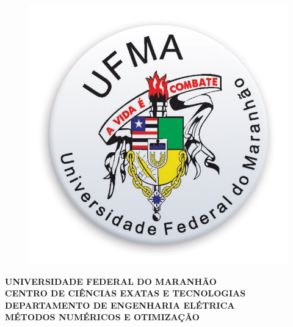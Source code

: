 \documentclass[
	12pt,				%
	oneside,			%
	a4paper,			%
	english,			%
	french,				%
	spanish,			%
	brazil				%
	]{abntex2}
\begin{document}

\frenchspacing 

\pretextual
\begin{center}			
	\begin{figure}[htb]
		\centering
		\includegraphics[scale=0.15]{ufmalogo.jpg}
	\end{figure}
				
			\textbf{UNIVERSIDADE FEDERAL DO MARANHÃO \\
					CENTRO DE CIÊNCIAS EXATAS E TECNOLOGIAS \\
					DEPARTAMENTO DE ENGENHARIA ELÉTRICA \\
				    MÉTODOS NUMÉRICOS E OTIMIZAÇÃO\\\vspace{4cm}}
					

\end{center}
\end{document}

